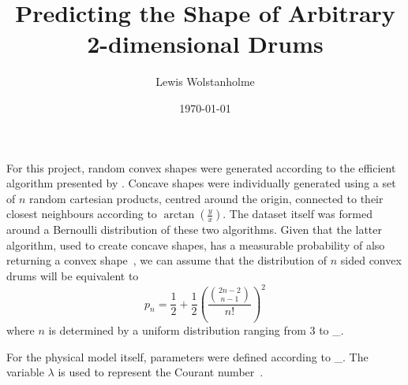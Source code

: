 \title{Predicting the Shape of Arbitrary 2-dimensional Drums}
\author{Lewis Wolstanholme}
\date{\getDate\today}
\maketitle

\noindent For this project, random convex shapes were generated according to the efficient algorithm presented by \citet{valtrProbabilityThatRandom1995}.
Concave shapes were individually generated using a set of \(n\) random cartesian products, centred around the origin, connected to their closest neighbours according to \(\displaystyle \arctan \left( \frac{y}{x} \right)\).
The dataset itself was formed around a Bernoulli distribution of these two algorithms.
Given that the latter algorithm, used to create concave shapes, has a measurable probability of also returning a convex shape~\citep{valtrProbabilityThatRandom1995}, we can assume that the distribution of \(n\) sided convex drums will be equivalent to
\[ p_n = \frac{1}{2} + \frac{1}{2}\left( \frac{\genfrac(){0pt}{1}{2n - 2}{n-1}}{n!}\right)^2\]
where \(n\) is determined by a uniform distribution ranging from 3 to \_.

For the physical model itself, parameters were defined according to \_. The variable \(\lambda\) is used to represent the Courant number~\citep{courantPartialDifferenceEquations1967}.